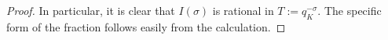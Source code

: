 \begin{proof}
 
In particular, it is clear that $I(\sigma)$ is rational in $T:=q_K^{-\sigma}$. The specific form of the fraction follows easily from the calculation.

\end{proof}